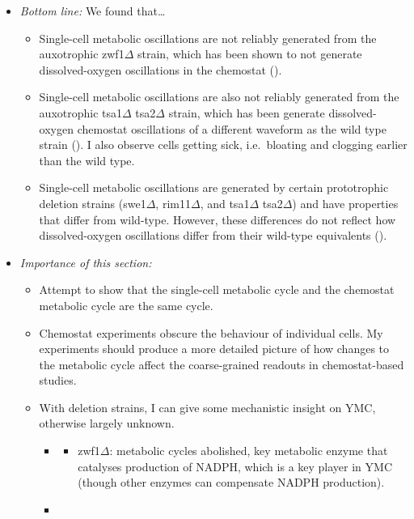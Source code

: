 \begin{itemize}
\item \emph{Bottom line:} We found that\ldots{}
\begin{itemize}
\item Single-cell metabolic oscillations are not reliably generated from the auxotrophic zwf1\(\Delta\) strain, which has been shown to not generate dissolved-oxygen oscillations in the chemostat (\cite{tuCyclicChangesMetabolic2007}).
\item Single-cell metabolic oscillations are also not reliably generated from the auxotrophic tsa1\(\Delta\) tsa2\(\Delta\) strain, which has been generate dissolved-oxygen chemostat oscillations of a different waveform as the wild type strain (\cite{caustonMetabolicCyclesYeast2015}).  I also observe cells getting sick, i.e.\ bloating and clogging earlier than the wild type.
\item Single-cell metabolic oscillations are generated by certain prototrophic deletion strains (swe1\(\Delta\), rim11\(\Delta\), and tsa1\(\Delta\) tsa2\(\Delta\)) and have properties that differ from wild-type.  However, these differences do not reflect how dissolved-oxygen oscillations differ from their wild-type equivalents (\cite{caustonMetabolicCyclesYeast2015}).
\end{itemize}
\item \emph{Importance of this section:}
\begin{itemize}
\item Attempt to show that the single-cell metabolic cycle and the chemostat metabolic cycle are the same cycle.
\item Chemostat experiments obscure the behaviour of individual cells.  My experiments should produce a more detailed picture of how changes to the metabolic cycle affect the coarse-grained readouts in chemostat-based studies.
\item With deletion strains, I can give some mechanistic insight on YMC, otherwise largely unknown.
\begin{itemize}
\item \cite{tuCyclicChangesMetabolic2007}
\begin{itemize}
\item zwf1\(\Delta\): metabolic cycles abolished, key metabolic enzyme that catalyses production of NADPH, which is a key player in YMC (though other enzymes can compensate NADPH production).
\end{itemize}
\item \cite{caustonMetabolicCyclesYeast2015}

\end{itemize}
\end{itemize}
\end{itemize}
